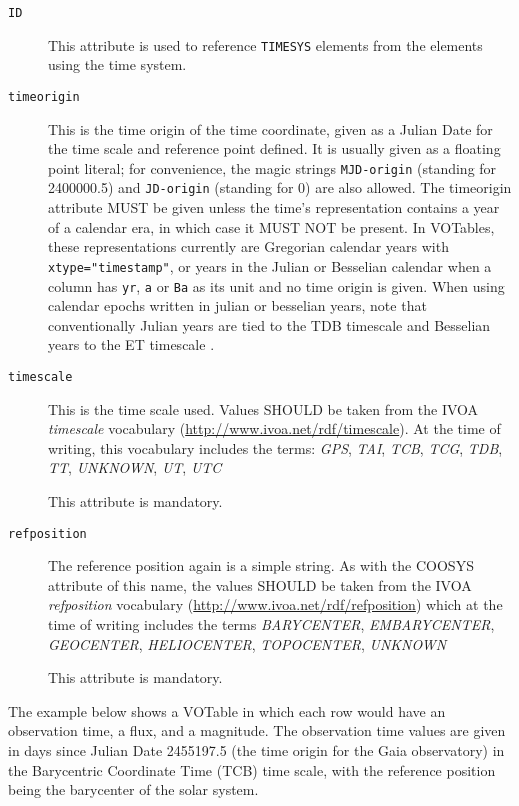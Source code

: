 \documentclass[11pt,a4paper]{ivoa}
\let\fg=\color
\def\attr#1{{\tt{\fg{DarkRed}#1}}}
\def\elem#1{{\tt{\fg{DarkRed}#1}}}
\def\attrval#1#2{{\tt{\fg{DarkRed}#1}="{\fg{DarkPurple}#2}"}}
\begin{document}
\begin{description}
\item[\attr{ID}] This attribute is used to reference \elem{TIMESYS}
elements from the elements using the time system.
\item[\attr{timeorigin}] This is the time origin of the time coordinate,
given as a Julian Date for the  time scale and reference point
defined.  It is usually given as a floating point
literal; for convenience, the magic strings \verb|MJD-origin| (standing
for 2400000.5) and \verb|JD-origin| (standing for 0) are also allowed.
The timeorigin attribute MUST be given unless the time's representation
contains a year of a calendar era, in which case it MUST NOT be present.
In VOTables, these
representations currently are Gregorian calendar years with
\attrval{xtype}{timestamp}, or years in the Julian or Besselian calendar when a column
has \verb|yr|, \verb|a| or \verb|Ba| as its unit and no time origin is
given.
When using calendar epochs written in julian or besselian years, note that
conventionally Julian years are tied to the TDB timescale and Besselian years to
the ET timescale \citep{2015A+A...574A..36R}.

\item[\attr{timescale}]  This is the time scale used.  Values SHOULD be
taken from the IVOA \emph{timescale} vocabulary (\url{http://www.ivoa.net/rdf/timescale}).
At the time of writing, this vocabulary includes the terms:
\textsl{GPS},
\textsl{TAI},
\textsl{TCB},
\textsl{TCG},
\textsl{TDB},
\textsl{TT},
\textsl{UNKNOWN},
\textsl{UT},
\textsl{UTC}

This attribute is mandatory.
\item[\attr{refposition}] The reference position again is a simple string.
As with the COOSYS attribute of this name, the values SHOULD be
taken from the IVOA \emph{refposition} vocabulary
(\url{http://www.ivoa.net/rdf/refposition}) which at the time of writing
includes the terms
\textsl{BARYCENTER},
\textsl{EMBARYCENTER},
\textsl{GEOCENTER},
\textsl{HELIOCENTER},
\textsl{TOPOCENTER},
\textsl{UNKNOWN}

This attribute is mandatory.
\end{description}

The example below shows a VOTable in which each row would have an observation
time, a flux, and a magnitude.  The observation time values are given in days since
Julian Date 2455197.5 (the time origin for the Gaia observatory) in the Barycentric
Coordinate Time (TCB) time scale, with the reference position being the barycenter
of the solar system.
\end{document}
